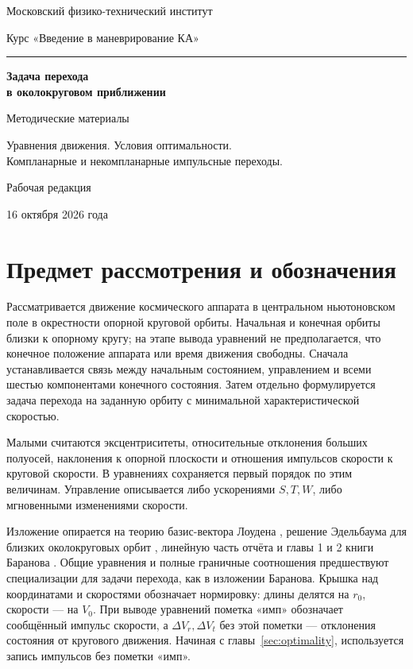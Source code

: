 \documentclass[a4paper,11pt]{article}
\numberwithin{equation}{section}
\theoremstyle{remark}
\begin{document}
\begin{titlepage}
\centering
{\large Московский физико-технический институт\par}
\vspace{8mm}
{\large Курс «Введение в маневрирование КА»\par}
\vspace{32mm}
{\color{accent}\rule{28mm}{.8pt}\par}
\vspace{9mm}
{\LARGE\bfseries Задача перехода\\[3mm]
в околокруговом приближении\par}
\vspace{10mm}
{\large Методические материалы\par}
\vspace{8mm}
{Уравнения движения. Условия оптимальности.\\
Компланарные и некомпланарные импульсные переходы.\par}
\vfill
{Рабочая редакция\par}
\vspace{3mm}
{16 октября 2026 года\par}
\end {titlepage}
\setcounter{page}{2}
\tableofcontents
\clearpage

\section*{Предмет рассмотрения и обозначения}

Рассматривается движение космического аппарата в центральном
ньютоновском поле в окрестности опорной круговой орбиты.
Начальная и конечная орбиты близки к опорному кругу; на этапе
вывода уравнений не предполагается, что конечное положение аппарата или время
движения свободны. Сначала устанавливается связь между начальным
состоянием, управлением и всеми шестью компонентами конечного
состояния. Затем отдельно формулируется задача перехода на заданную
орбиту с минимальной характеристической скоростью.

Малыми считаются эксцентриситеты, относительные отклонения больших
полуосей, наклонения к опорной плоскости и отношения импульсов
скорости к круговой скорости. В уравнениях сохраняется первый
порядок по этим величинам. Управление описывается либо ускорениями
$S,T,W$, либо мгновенными изменениями скорости.

Изложение опирается на теорию базис-вектора Лоудена
\cite{lawden}, решение Эдельбаума для близких околокруговых
орбит \cite{edelbaum}, линейную часть отчёта \cite{gobetz}
и главы 1 и 2 книги Баранова \cite{baranov-ru}.
Общие уравнения и полные граничные соотношения предшествуют
специализации для задачи перехода, как в изложении Баранова.
Крышка над координатами и скоростями обозначает нормировку:
длины делятся на $r_0$, скорости --- на $V_0$.
При выводе уравнений пометка «имп» обозначает сообщённый импульс
скорости, а $\Delta V_r,\Delta V_t$ без этой пометки --- отклонения
состояния от кругового движения. Начиная с главы~\ref{sec:optimality},
используется запись импульсов без пометки «имп».
\end{document}
